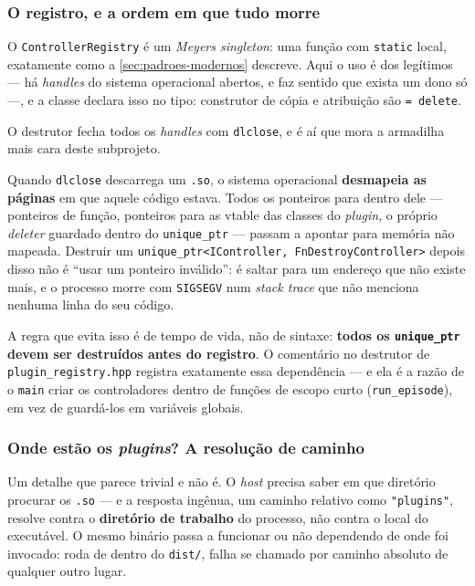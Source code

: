 \subsubsection{O registro, e a ordem em que tudo morre}

O \texttt{ControllerRegistry} é um \emph{Meyers singleton}: uma função com
\texttt{static} local, exatamente como a \cref{sec:padroes-modernos} descreve.
Aqui o uso é dos legítimos --- há \emph{handles} do sistema operacional abertos,
e faz sentido que exista um dono só ---, e a classe declara isso no tipo:
construtor de cópia e atribuição são \texttt{= delete}.

O destrutor fecha todos os \emph{handles} com \texttt{dlclose}, e é aí que mora
a armadilha mais cara deste subprojeto.

\begin{armadilha}
Quando \texttt{dlclose} descarrega um \texttt{.so}, o sistema operacional
\textbf{desmapeia as páginas} em que aquele código estava. Todos os ponteiros
para dentro dele --- ponteiros de função, ponteiros para as \gls{vtable} das
classes do \emph{plugin}, o próprio \emph{deleter} guardado dentro do
\texttt{unique\_ptr} --- passam a apontar para memória não mapeada. Destruir um
\texttt{unique\_ptr<IController, FnDestroyController>} depois disso não é ``usar
um ponteiro inválido'': é saltar para um endereço que não existe mais, e o
processo morre com \texttt{SIGSEGV} num \emph{stack trace} que não menciona
nenhuma linha do seu código.

A regra que evita isso é de tempo de vida, não de sintaxe: \textbf{todos os
\texttt{unique\_ptr} devem ser destruídos antes do registro}. O comentário no
destrutor de \texttt{plugin\_registry.hpp} registra exatamente essa
dependência --- e ela é a razão de o \texttt{main} criar os controladores dentro
de funções de escopo curto (\texttt{run\_episode}), em vez de guardá-los em
variáveis globais.
\end{armadilha}

\subsubsection{Onde estão os \emph{plugins}? A resolução de caminho}

Um detalhe que parece trivial e não é. O \emph{host} precisa saber em que
diretório procurar os \texttt{.so} --- e a resposta ingênua, um caminho relativo
como \texttt{"plugins"}, resolve contra o \textbf{diretório de trabalho} do
processo, não contra o local do executável. O mesmo binário passa a funcionar ou
não dependendo de onde foi invocado: roda de dentro do \texttt{dist/}, falha se
chamado por caminho absoluto de qualquer outro lugar.

